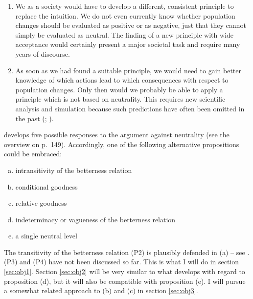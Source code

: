 \begin{enumerate}
\item We as a society would have to develop a different, consistent principle to replace the intuition. We do not even currently know whether population changes should be evaluated as positive or as negative, just that they cannot simply be evaluated as neutral. The finding of a new principle with wide acceptance would certainly present a major societal task and require many years of discourse. 
\item As soon as we had found a suitable principle, we would need to gain better knowledge of which actions lead to which consequences with respect to population changes. Only then would we probably be able to apply a principle which is not based on neutrality. This requires new scientific analysis and simulation because such predictions have often been omitted in the past (; ). 
\end{enumerate}

 develops five possible responses to the argument against neutrality (see the overview on p.~149). Accordingly, one of the following alternative propositions could be embraced: 

\begin{enumerate}[(a)]
\item intransitivity of the betterness relation 
\item conditional goodness
\item relative goodness
\item indeterminacy or vagueness of the betterness relation
\item a single neutral level
\end{enumerate}

The transitivity of the betterness relation (P2) is plausibly defended in (a) -- see . 
(P3) and (P4) have not been discussed so far. This is what I will do in section \ref{sec:obj1}. 
Section \ref{sec:obj2} will be very similar to what  develops with regard to proposition (d), but it will also be compatible with proposition (e). 
I will pursue a somewhat related approach to (b) and (c) in section \ref{sec:obj3}.